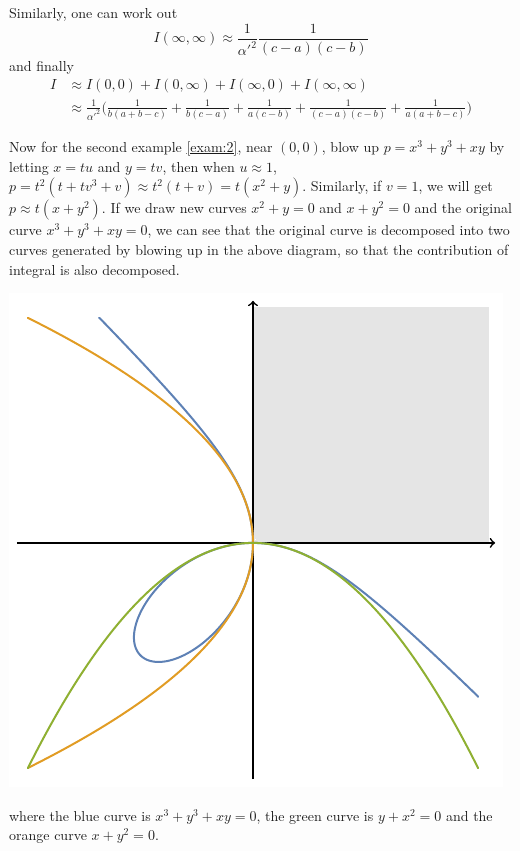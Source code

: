 \documentclass[12pt]{article}
\theoremstyle{definition}
\theoremstyle{plain}
\begin{document}
Similarly, one can work out 
\[
	I(\infty,\infty)\approx \frac{1}{{\alpha'}^2}\frac{1}{(c-a) (c-b)} 
\]
and finally
\begin{align*}
	I&\approx I(0,0)+I(0,\infty)+I(\infty,0)+I(\infty,\infty)\\
	 &\approx \frac{1}{{\alpha'}^2}
	 \biggl(
\frac{1}{b (a+b-c)}+\frac{1}{b (c-a)}+\frac{1}{a (c-b)}+\frac{1}{(c-a) (c-b)}+\frac{1}{a (a+b-c)}
	 \biggr)
\end{align*}

Now for the second example \eqref{exam:2}, near $(0,0)$, blow up $p=x^3+y^3+x y$ by letting
$x=tu$ and $y=tv$, then when $u\approx 1$, 
$p=t^2(t +t v^3+ v)\approx t^2(t+v)=t(x^2+y)$. 
Similarly, if $v=1$, we will get $p\approx t(x+y^2)$. 
If we draw new curves $x^2+y=0$ and $x+y^2=0$ and the original curve $x^3+y^3+xy=0$, 
we can see that the original curve is 
decomposed into two curves generated by blowing up in the above diagram, so that 
the contribution of integral is also decomposed.
\begin{center}
	\includegraphics[scale=0.7]{fig_2.pdf}	
\end{center}
where the blue curve is $x^3+y^3+xy=0$, the green curve is $y+x^2=0$ and
the orange curve $x+y^2=0$.
\end{document}
